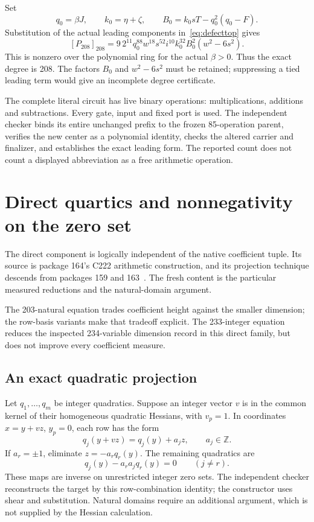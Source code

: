 \documentclass[11pt]{article}
\theoremstyle{remark}\newtheorem{remark}[theorem]{Remark}
\newcommand{\Z}{\mathbb Z}\newcommand{\N}{\mathbb N}
\newcommand{\topdeg}[2]{[#1]_{#2}}
\begin{document}
Set
\[
 q_0=\beta J,\qquad k_0=\eta+\zeta,\qquad
 B_0=k_0sT-q_0^2(q_0-F).
\]
Substitution of the actual leading components in~\eqref{eq:defecttop}
gives
\begin{equation}\label{eq:maintop}
 \boxed{\displaystyle
 \topdeg{P_{208}}{208}
 =9\,2^{11}q_0^{88}w^{18}s^{52}i^{10}k_0^{32}
 B_0^2(w^2-6s^2).}
\end{equation}
This is nonzero over the polynomial ring for the actual $\beta>0$.
Thus the exact degree is 208. The factors $B_0$ and $w^2-6s^2$ must
be retained; suppressing a tied leading term would give an incomplete
degree certificate.

The complete literal circuit has \PrimaryOps{} live binary operations:
\PrimaryMul{} multiplications, \PrimaryAdd{} additions and
\PrimarySub{} subtractions. Every gate, input and fixed port is used.
The independent checker binds its entire unchanged prefix to the frozen
85-operation parent, verifies the new center as a polynomial identity,
checks the altered carrier and finalizer, and establishes the exact
leading form. The reported count does not count a displayed abbreviation
as a free arithmetic operation.

\section{Direct quartics and nonnegativity on the zero set}\label{sec:quartics}

The direct component is logically independent of the native coefficient
tuple. Its source is package 164's C222 arithmetic construction, and its
projection technique descends from packages 159 and 163~\cite{p159,p163}. The fresh content
is the particular measured reductions and the natural-domain argument.

The 203-natural equation trades coefficient height against the smaller
dimension; the row-basis variants make that tradeoff explicit. The
233-integer equation reduces the inspected 234-variable dimension record
in this direct family, but does not improve every coefficient measure.

\subsection{An exact quadratic projection}

Let $q_1,\ldots,q_m$ be integer quadratics. Suppose an integer vector $v$
is in the common kernel of their homogeneous quadratic Hessians, with
$v_p=1$. In coordinates $x=y+vz$, $y_p=0$, each row has the form
\[
 q_j(y+vz)=q_j(y)+a_jz,
 \qquad a_j\in\Z.
\]
If $a_r=\pm1$, eliminate $z=-a_rq_r(y)$. The remaining quadratics are
\[
 q_j(y)-a_ra_jq_r(y)=0\qquad(j\ne r).
\]
These maps are inverse on unrestricted integer zero sets. The independent
checker reconstructs the target by this row-combination identity; the
constructor uses shear and substitution. Natural domains require an
additional argument, which is not supplied by the Hessian calculation.
\end{document}
